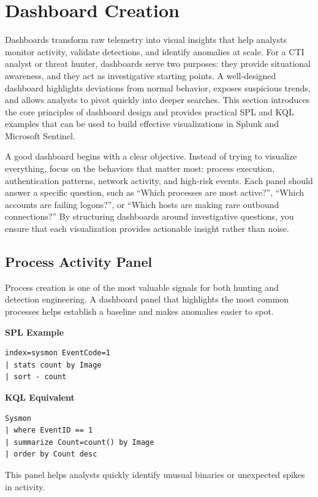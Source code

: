 \section{Dashboard Creation}

Dashboards transform raw telemetry into visual insights that help analysts monitor activity, validate detections, and identify anomalies at scale. For a CTI analyst or threat hunter, dashboards serve two purposes: they provide situational awareness, and they act as investigative starting points. A well‑designed dashboard highlights deviations from normal behavior, exposes suspicious trends, and allows analysts to pivot quickly into deeper searches. This section introduces the core principles of dashboard design and provides practical SPL and KQL examples that can be used to build effective visualizations in Splunk and Microsoft Sentinel.

A good dashboard begins with a clear objective. Instead of trying to visualize everything, focus on the behaviors that matter most: process execution, authentication patterns, network activity, and high‑risk events. Each panel should answer a specific question, such as “Which processes are most active?”, “Which accounts are failing logons?”, or “Which hosts are making rare outbound connections?” By structuring dashboards around investigative questions, you ensure that each visualization provides actionable insight rather than noise.

\subsection*{Process Activity Panel}

Process creation is one of the most valuable signals for both hunting and detection engineering. A dashboard panel that highlights the most common processes helps establish a baseline and makes anomalies easier to spot.

\textbf{SPL Example}
\begin{lstlisting}
index=sysmon EventCode=1
| stats count by Image
| sort - count
\end{lstlisting}

\textbf{KQL Equivalent}
\begin{lstlisting}
Sysmon
| where EventID == 1
| summarize Count=count() by Image
| order by Count desc
\end{lstlisting}

This panel helps analysts quickly identify unusual binaries or unexpected spikes in activity.

